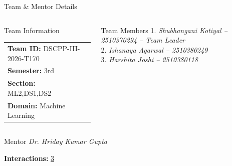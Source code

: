 \documentclass[aspectratio=169,11pt]{beamer}
\newcommand{\placeholder}[1]{%
\textit{\color{GEUGrey}#1}
}
\begin{document}
\begin{frame}{Team \& Mentor Details}

\begin{columns}[T,totalwidth=\textwidth]


\begin{block}{Team Information}
\begin{tabular}{@{}ll@{}}
\textbf{Team ID:} DSCPP-III-2026-T170\\
\textbf{Semester:} 3rd \\
\textbf{Section:} ML2,DS1,DS2 \\
\textbf{Domain:} Machine Learning
\end{tabular}
\end{block}


\begin{block}{Team Members}
1.\quad \placeholder{Shubhangani Kotiyal -- 2510370294 – Team Leader}\\
2.\quad \placeholder{Ishanaya Agarwal -- 2510380249}\\
3.\quad \placeholder{Harshita Joshi -- 2510380118}\\
\end{block}

\end{columns}

\vspace{2mm}

\begin{block}{Mentor}
\placeholder{Dr. Hriday Kumar Gupta }
\hfill
\textbf{Interactions:}  \underline 3 {\hspace{12mm}}
\end{block}

\vfill


\end{frame}
\end{document}
